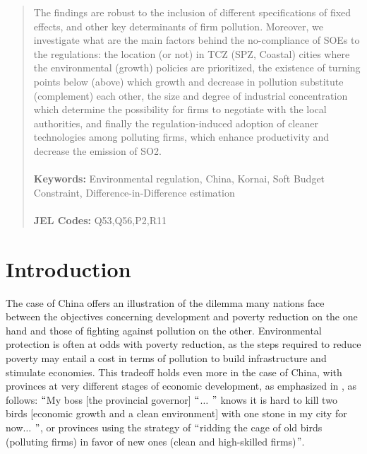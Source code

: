 \documentclass[12pt]{article}
\begin{document}
\begin{titlepage}
\begin{abstract}
The findings are robust to the inclusion of different specifications of fixed effects, and other key determinants of firm pollution. Moreover, we investigate what are the main factors behind the no-compliance of SOEs to the regulations: the location (or not) in TCZ (SPZ, Coastal) cities where the environmental (growth) policies are prioritized, the existence of turning points below (above) which growth and decrease in pollution substitute (complement) each other, the size and degree of industrial concentration which determine the possibility for firms to negotiate with the local authorities, and finally the regulation-induced adoption of cleaner technologies among polluting firms, which enhance productivity and decrease the emission of SO2.  \\
\vspace{0em}\\
\noindent\textbf{Keywords:} Environmental regulation, China, Kornai, Soft Budget Constraint, Difference-in-Difference estimation\\
\vspace{0em}\\
\noindent\textbf{JEL Codes:} Q53,Q56,P2,R11
\\

\bigskip
\end{abstract}
\setcounter{page}{0}
\thispagestyle{empty}
\end{titlepage}
\pagebreak \newpage

\doublespacing

\section{Introduction }

The case of China offers an illustration of the dilemma many nations face between the objectives concerning development and poverty reduction on the one hand and those of fighting against pollution on the other. Environmental protection is often at odds with poverty reduction, as the steps required to reduce poverty may entail a cost in terms of pollution to build infrastructure and stimulate economies. This tradeoff holds even more in the case of China, with provinces at very different stages of economic development, as emphasized in \citet[p.196 and p.198]{Kahn2016-fi}, as follows: $``$My boss [the provincial governor] $``$$ \ldots $ $"$  knows it is hard to kill two birds [economic growth and a clean environment] with one stone in my city for now$ \ldots $ $"$, or provinces using the strategy of $``$ridding the cage of old birds (polluting firms) in favor of new ones (clean and high-skilled firms)$"$.
\end{document}
